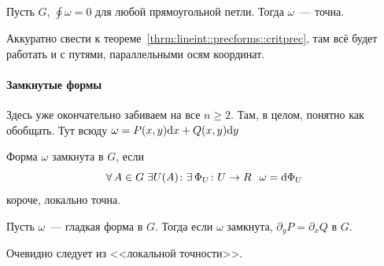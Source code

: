 \documentclass[12pt,timbord]{../../../notes}
\begin{document}
\begin{thrm}\label{thrm:lineint::precforms::precrecloop}
  Пусть $G$, $\oint \omega =0 $ для любой прямоугольной петли. Тогда $\omega$~--- точна.
\end{thrm}
\begin{ittproof}
  Аккуратно свести к теореме~\ref{thrm:lineint::precforms::critprec}, там всё будет работать и с
  путями, параллельными осям координат.
\end{ittproof}

\paragraph{Замкнутые формы}
\label{par:lineint::closforms}
Здесь уже окончательно забиваем на все $n \geqslant 2$. Там, в целом, понятно как обобщать.
Тут всюду $\omega =  P(x,y) \mathrm{d} x + Q(x,y) \mathrm{d} y$
\begin{defn}\label{defn:lineint::closforms::closform}
  Форма $\omega$ замкнута в $G$, если
  \[
    \forall\, A \in G \; \exists U (A) \colon \exists\, \Phi_U\colon U\to R \;\:\: \omega = \mathrm{d}
    \Phi_U
  \]
  короче, локально точна.
\end{defn}

\begin{thrm}\label{thrm:lineint::closforms::nessdiff}
  Пусть $\omega$~--- гладкая форма в $G$. Тогда если $\omega$ замкнута,
  $\partial_y P = \partial_x Q$ в $G$.
\end{thrm}
\begin{ittproof}
  Очевидно следует из <<локальной точности>>.
\end{ittproof}
\end{document}
